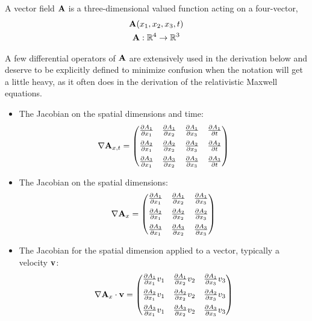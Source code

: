 \documentclass[12pt]{article}
\begin{document}
A vector field $\vb{A}$ is a three-dimensional valued function acting on a four-vector,
\begin{equation}
  \begin{gathered}
    \vb{A}(x_1, x_2, x_3, t) \\
    \vb{A}: \mathbb{R}^4 \to \mathbb{R}^3
  \end{gathered}
\end{equation}

A few differential operators of $\vb{A}$ are extensively used in the derivation below and
deserve to be explicitly defined to minimize confusion when the notation will get a little
heavy, as it often does in the derivation of the relativistic Maxwell equations.

\begin{itemize}
  \item The Jacobian on the spatial dimensions and time:
  \begin{equation}
    \nabla \vb{A}_{x,t} =
    \begin{pmatrix}
      \pdv{A_1}{x_1} & \pdv{A_1}{x_2} & \pdv{A_1}{x_3} & \pdv{A_1}{t} \\[6pt]
      \pdv{A_2}{x_1} & \pdv{A_2}{x_2} & \pdv{A_2}{x_3} & \pdv{A_2}{t} \\[6pt]
      \pdv{A_3}{x_1} & \pdv{A_3}{x_2} & \pdv{A_3}{x_3} & \pdv{A_3}{t}
    \end{pmatrix}
  \end{equation}

  \item The Jacobian on the spatial dimensions:
  \begin{equation}
    \nabla \vb{A}_{x} =
    \begin{pmatrix}
      \pdv{A_1}{x_1} & \pdv{A_1}{x_2} & \pdv{A_1}{x_3} \\[6pt]
      \pdv{A_2}{x_1} & \pdv{A_2}{x_2} & \pdv{A_2}{x_3} \\[6pt]
      \pdv{A_3}{x_1} & \pdv{A_3}{x_2} & \pdv{A_3}{x_3}
    \end{pmatrix}
  \end{equation}

  \item The Jacobian for the spatial dimension applied to a vector, typically a velocity
        $\vb{v}$:
  \begin{equation}
    \nabla \vb{A}_x \cdot \vb{v} =
    \begin{pmatrix}
      \pdv{A_1}{x_1}v_1 & \pdv{A_1}{x_2}v_2 & \pdv{A_1}{x_3}v_3 \\[6pt]
      \pdv{A_2}{x_1}v_1 & \pdv{A_2}{x_2}v_2 & \pdv{A_2}{x_3}v_3 \\[6pt]
      \pdv{A_3}{x_1}v_1 & \pdv{A_3}{x_2}v_2 & \pdv{A_3}{x_3}v_3
    \end{pmatrix}
  \end{equation}


\end{itemize}
\end{document}

